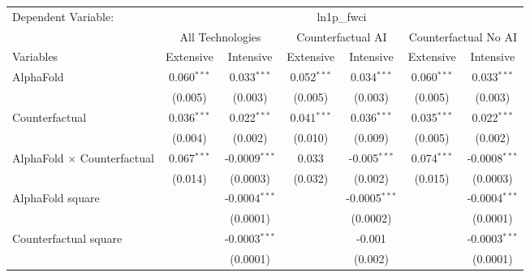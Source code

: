 \begingroup
\centering
\begin{tabular}{lcccccc}
   \tabularnewline \midrule \midrule
   Dependent Variable: & \multicolumn{6}{c}{ln1p\_fwci}\\
 & \multicolumn{2}{c}{All Technologies} & \multicolumn{2}{c}{Counterfactual AI} & \multicolumn{2}{c}{Counterfactual No AI} \\
\cmidrule(lr){1-1}\cmidrule(lr){2-3} \cmidrule(lr){4-5} \cmidrule(lr){6-7}
Variables & \multicolumn{1}{c}{Extensive} & \multicolumn{1}{c}{Intensive} & \multicolumn{1}{c}{Extensive} & \multicolumn{1}{c}{Intensive} & \multicolumn{1}{c}{Extensive} & \multicolumn{1}{c}{Intensive} \\
\cmidrule(lr){1-1}\cmidrule(lr){2-2} \cmidrule(lr){3-3} \cmidrule(lr){4-4} \cmidrule(lr){5-5} \cmidrule(lr){6-6} \cmidrule(lr){7-7}
   AlphaFold                          & 0.060$^{***}$ & 0.033$^{***}$     & 0.052$^{***}$ & 0.034$^{***}$    & 0.060$^{***}$ & 0.033$^{***}$\\   
                                      & (0.005)       & (0.003)           & (0.005)       & (0.003)          & (0.005)       & (0.003)\\   
   Counterfactual                     & 0.036$^{***}$ & 0.022$^{***}$     & 0.041$^{***}$ & 0.036$^{***}$    & 0.035$^{***}$ & 0.022$^{***}$\\   
                                      & (0.004)       & (0.002)           & (0.010)       & (0.009)          & (0.005)       & (0.002)\\   
   AlphaFold $\times$ Counterfactual  & 0.067$^{***}$ & -0.0009$^{***}$   & 0.033         & -0.005$^{***}$   & 0.074$^{***}$ & -0.0008$^{***}$\\   
                                      & (0.014)       & (0.0003)          & (0.032)       & (0.002)          & (0.015)       & (0.0003)\\   
   AlphaFold square                   &               & -0.0004$^{***}$   &               & -0.0005$^{***}$  &               & -0.0004$^{***}$\\   
                                      &               & (0.0001)          &               & (0.0002)         &               & (0.0001)\\   
   Counterfactual square              &               & -0.0003$^{***}$   &               & -0.001           &               & -0.0003$^{***}$\\   
                                      &               & (0.0001)          &               & (0.002)          &               & (0.0001)\\   

\end{tabular}
